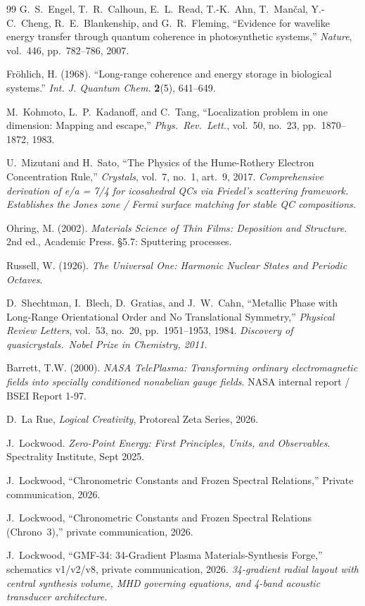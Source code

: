 \begin{thebibliography}{99}
G.~S.~Engel, T.~R.~Calhoun, E.~L.~Read, T.-K.~Ahn, T.~Man\v{c}al, Y.-C.~Cheng,
R.~E.~Blankenship, and G.~R.~Fleming,
``Evidence for wavelike energy transfer through quantum coherence in photosynthetic systems,''
\emph{Nature}, vol.~446, pp.~782--786, 2007.

Fr\"ohlich, H. (1968).
``Long-range coherence and energy storage in biological systems.''
\textit{Int. J. Quantum Chem.} \textbf{2}(5), 641--649.

M.~Kohmoto, L.~P.~Kadanoff, and C.~Tang,
``Localization problem in one dimension: Mapping and escape,''
\emph{Phys.\ Rev.\ Lett.}, vol.~50, no.~23, pp.~1870--1872, 1983.

U.~Mizutani and H.~Sato,
``The Physics of the Hume-Rothery Electron Concentration Rule,''
\emph{Crystals}, vol.~7, no.~1, art.~9, 2017.
\textit{Comprehensive derivation of e/a = 7/4 for icosahedral QCs via Friedel's scattering framework. Establishes the Jones zone / Fermi surface matching for stable QC compositions.}

Ohring, M. (2002).
\textit{Materials Science of Thin Films: Deposition and Structure}.
2nd ed., Academic Press. \S5.7: Sputtering processes.

Russell, W. (1926).
\textit{The Universal One: Harmonic Nuclear States and Periodic Octaves}.

D.~Shechtman, I.~Blech, D.~Gratias, and J.~W.~Cahn,
``Metallic Phase with Long-Range Orientational Order and No Translational Symmetry,''
\emph{Physical Review Letters}, vol.~53, no.~20, pp.~1951--1953, 1984.
\textit{Discovery of quasicrystals.\ Nobel Prize in Chemistry, 2011.}

Barrett, T.W. (2000).
\textit{NASA TelePlasma: Transforming ordinary electromagnetic fields into specially conditioned nonabelian gauge fields}.
NASA internal report / BSEI Report 1-97.

D.~La Rue, \emph{Logical Creativity}, Protoreal Zeta Series, 2026.

J.~Lockwood.
\textit{Zero-Point Energy: First Principles, Units, and Observables}.
Spectrality Institute, Sept 2025.

J.~Lockwood,
``Chronometric Constants and Frozen Spectral Relations,''
Private communication, 2026.

J.~Lockwood, ``Chronometric Constants and Frozen Spectral Relations (Chrono~3),'' private communication, 2026.

J.~Lockwood,
``GMF-34: 34-Gradient Plasma Materials-Synthesis Forge,''
schematics v1/v2/v8, private communication, 2026.
\textit{34-gradient radial layout with central synthesis volume, MHD governing equations, and 4-band acoustic transducer architecture.}

\end{thebibliography}
